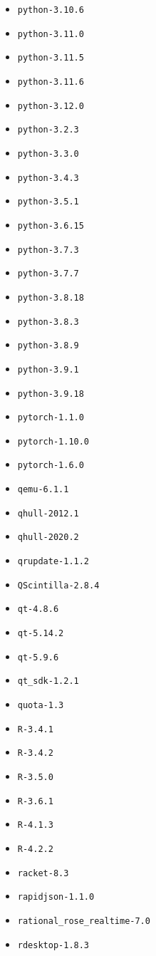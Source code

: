 \begin{multicols}{3}
\begin{itemize}
\item \verb|python-3.10.6|
\item \verb|python-3.11.0|
\item \verb|python-3.11.5|
\item \verb|python-3.11.6|
\item \verb|python-3.12.0|
\item \verb|python-3.2.3|
\item \verb|python-3.3.0|
\item \verb|python-3.4.3|
\item \verb|python-3.5.1|
\item \verb|python-3.6.15|
\item \verb|python-3.7.3|
\item \verb|python-3.7.7|
\item \verb|python-3.8.18|
\item \verb|python-3.8.3|
\item \verb|python-3.8.9|
\item \verb|python-3.9.1|
\item \verb|python-3.9.18|
\item \verb|pytorch-1.1.0|
\item \verb|pytorch-1.10.0|
\item \verb|pytorch-1.6.0|
\item \verb|qemu-6.1.1|
\item \verb|qhull-2012.1|
\item \verb|qhull-2020.2|
\item \verb|qrupdate-1.1.2|
\item \verb|QScintilla-2.8.4|
\item \verb|qt-4.8.6|
\item \verb|qt-5.14.2|
\item \verb|qt-5.9.6|
\item \verb|qt_sdk-1.2.1|
\item \verb|quota-1.3|
\item \verb|R-3.4.1|
\item \verb|R-3.4.2|
\item \verb|R-3.5.0|
\item \verb|R-3.6.1|
\item \verb|R-4.1.3|
\item \verb|R-4.2.2|
\item \verb|racket-8.3|
\item \verb|rapidjson-1.1.0|
\item \verb|rational_rose_realtime-7.0|
\item \verb|rdesktop-1.8.3|

\end{itemize}
\end{multicols}
